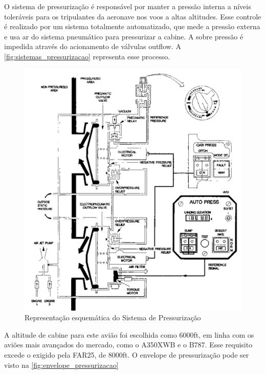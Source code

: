 O sistema de pressurização é responsável por manter a pressão interna a níveis toleráveis para os tripulantes da aeronave nos voos a altas altitudes.
Esse controle é realizado por um sistema totalmente automatizado, que mede a pressão externa e usa ar do sistema pneumático para pressurizar a cabine. 
A sobre pressão é impedida através do acionamento de válvulas outflow.
A \autoref{fig:sistemas_pressurizacao} representa esse processo.

\begin{figure}
\centering
\includegraphics[width=\textwidth]{images/parte3/sistemas_pressurizacao.png}
\caption{Representação esquemática do Sistema de Pressurização}
\label{fig:sistemas_pressurizacao}
\end{figure}

A altitude de cabine para este avião foi escolhida como 6000ft, em linha com os aviões mais avançados do mercado, como o A350XWB e o B787.
Esse requisito excede o exigido pela FAR25, de 8000ft. 
O envelope de pressurização pode ser visto na 
\autoref{fig:envelope_pressurizacao}

